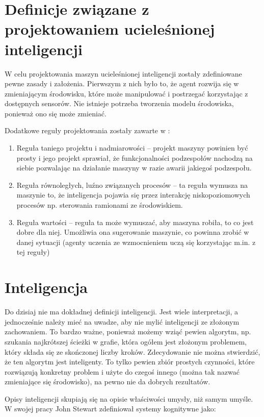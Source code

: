 \section{Definicje związane z projektowaniem ucieleśnionej inteligencji}

W celu projektowania maszyn ucieleśnionej inteligencji zostały zdefiniowane 
pewne zasady i założenia. Pierwszym z nich było to, że agent rozwija się w 
zmieniającym środowisku, które może manipulować i postrzegać korzystając z 
dostępnych sensorów. Nie istnieje potrzeba tworzenia modelu środowiska, 
ponieważ ono się może zmieniać. 

Dodatkowe reguły projektowania zostały zawarte w \cite{pfeifer_ei}:
\begin{enumerate}
	\item Reguła taniego projektu i nadmiarowości -- projekt maszyny powinien 
	być prosty i jego projekt sprawiał, że funkcjonalności podzespołów nachodzą 
	na siebie pozwalając na działanie maszyny w razie awarii jakiegoś 
	podzespołu.
	\item Reguła równoległych, luźno związanych procesów -- ta reguła wymusza 
	na maszynie to, że inteligencja pojawia się przez interakcję 
	niskopoziomowych procesów np. sterowania ramionami ze środowiskiem.
	\item Reguła wartości -- reguła ta może wymuszać, aby maszyna robiła, to co 
	jest dobre dla niej. Umożliwia ona sugerowanie maszynie, co powinna zrobić 
	w danej sytuacji (agenty uczenia ze wzmocnieniem uczą się korzystając m.in. 
	z tej reguły)
\end{enumerate}
		
\section{Inteligencja}
Do dzisiaj nie ma dokładnej definicji inteligencji. Jest wiele interpretacji, a 
jednocześnie należy mieć na uwadze, aby nie mylić inteligencji ze złożonym 
zachowaniem. To bardzo ważne, ponieważ możemy wziąć pewien algorytm, np. 
szukania najkrótszej ścieżki w grafie, która ogółem jest złożonym problemem, 
który składa się ze skończonej liczby kroków. Zdecydowanie nie można 
stwierdzić, że ten algorytm jest inteligenty. To tylko pewien zbiór prostych 
czynności, które rozwiązują konkretny problem i użyte do czegoś innego (można 
tak nazwać zmieniające się środowisko), na pewno nie da dobrych rezultatów.

Opisy inteligencji skupiają się na opisie właściwości umysły, niż samym umyśle. 
W swojej pracy \cite{stewart_93} John Stewart zdefiniował systemy kognitywne 
jako:

